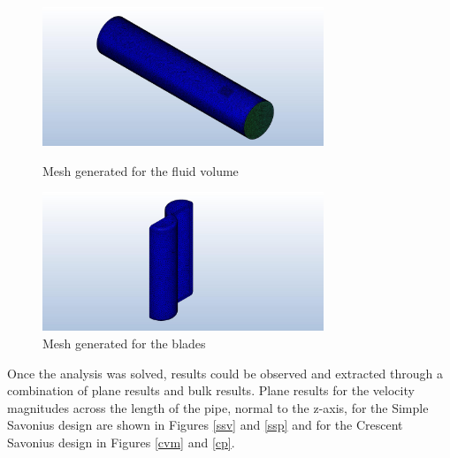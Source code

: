 \documentclass[12pt]{article}
\begin{document}

\begin{figure}[ht]
\begin{minipage}{0.5\textwidth}
\begin{center}
\includegraphics[width=0.75\textwidth]{Fluid_Volume_Mesh}
\caption[p1] {Mesh generated for the fluid volume}
\label{VFM}
\end{center}
\end{minipage}
\begin{minipage}{0.5\textwidth}
\begin{center}
\includegraphics[width=0.75\textwidth]{Blade_Mesh}
\caption[p1] {Mesh generated for the blades}
\label{Fig:BM}
\end{center}
\end{minipage}
\end{figure}
\hspace{0.5 in}Once the analysis was solved, results could be observed and extracted through a combination of plane results and bulk results. Plane results for the velocity magnitudes across the length of the pipe, normal to the z-axis, for the Simple Savonius design are shown in Figures \ref{ssv} and \ref{ssp} and for the Crescent Savonius design in Figures \ref{cvm} and \ref{cp}.
\end{document}
